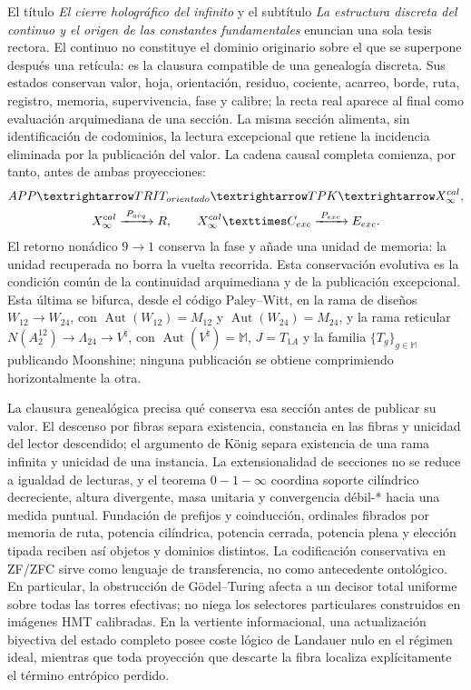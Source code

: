El título \emph{El cierre holográfico del infinito} y el subtítulo
\emph{La estructura discreta del continuo y el origen de las constantes
fundamentales} enuncian una sola tesis rectora. El continuo no constituye el
dominio originario sobre el que se superpone después una retícula: es la
clausura compatible de una genealogía discreta. Sus estados conservan valor,
hoja, orientación, residuo, cociente, acarreo, borde, ruta, registro, memoria,
supervivencia, fase y calibre; la recta real aparece al final como evaluación
arquimediana de una sección. La misma sección alimenta, sin identificación de
codominios, la lectura excepcional que retiene la incidencia eliminada por la
publicación del valor. La cadena causal completa comienza, por tanto, antes de
ambas proyecciones:
\[
\begin{gathered}
 \mathrm{APP}
 \longrightarrow \mathrm{TRIT}_{\rm orientado}
 \longrightarrow \mathrm{TPK}
 \longrightarrow \mathcal X_\infty^{\rm cal},\\
 \mathcal X_\infty^{\rm cal}
 \xrightarrow{\;\mathcal P_{\rm arq}\;}\mathbb R,
 \qquad
 \mathcal X_\infty^{\rm cal}\times\mathcal C_{\rm exc}
 \xrightarrow{\;\mathcal P_{\rm exc}\;}\mathcal E_{\rm exc}.
\end{gathered}
\]
El retorno nonádico \(9\to1\) conserva la fase y añade una unidad de memoria:
la unidad recuperada no borra la vuelta recorrida. Esta conservación evolutiva
es la condición común de la continuidad arquimediana y de la publicación
excepcional. Esta última se bifurca, desde el código Paley--Witt, en la rama
de diseños \(W_{12}\to W_{24}\), con
\(\operatorname{Aut}(W_{12})=M_{12}\) y
\(\operatorname{Aut}(W_{24})=M_{24}\), y la rama reticular
\(N(A_2^{12})\to\Lambda_{24}\to V^\natural\), con
\(\operatorname{Aut}(V^\natural)=\mathbb M\), \(J=T_{1A}\) y la familia
\(\{T_g\}_{g\in\mathbb M}\) publicando Moonshine;
ninguna publicación se obtiene comprimiendo horizontalmente la otra.

La clausura genealógica precisa qué conserva esa sección antes de publicar su
valor. El descenso por fibras separa existencia, constancia en las fibras y
unicidad del lector descendido; el argumento de K\"onig separa existencia de
una rama infinita y unicidad de una instancia. La extensionalidad de secciones
no se reduce a igualdad de lecturas, y el teorema \(0\!-1\!-\!\infty\)
coordina soporte cilíndrico decreciente, altura divergente, masa unitaria y
convergencia débil-* hacia una medida puntual. Fundación de prefijos y
coinducción, ordinales fibrados por memoria de ruta, potencia cilíndrica,
potencia cerrada, potencia plena y elección tipada reciben así objetos y
dominios distintos. La codificación conservativa en ZF/ZFC sirve como lenguaje
de transferencia, no como antecedente ontológico. En particular, la
obstrucción de G\"odel--Turing afecta a un decisor total uniforme sobre todas
las torres efectivas; no niega los selectores particulares construidos en
imágenes HMT calibradas. En la vertiente informacional, una actualización
biyectiva del estado completo posee coste lógico de Landauer nulo en el régimen
ideal, mientras que toda proyección que descarte la fibra localiza
explícitamente el término entrópico perdido.

